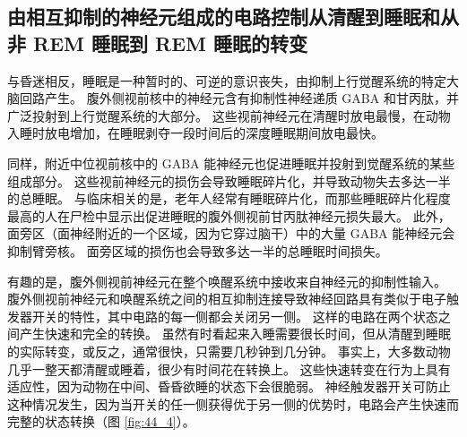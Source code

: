\subsection{由相互抑制的神经元组成的电路控制从清醒到睡眠和从非 REM 睡眠到 REM 睡眠的转变}

与昏迷相反，睡眠是一种暂时的、可逆的意识丧失，由抑制上行觉醒系统的特定大脑回路产生。
腹外侧视前核中的神经元含有抑制性神经递质 GABA 和甘丙肽，并广泛投射到上行觉醒系统的大部分。
这些视前神经元在清醒时放电最慢，在动物入睡时放电增加，在睡眠剥夺一段时间后的深度睡眠期间放电最快。


同样，附近中位视前核中的 GABA 能神经元也促进睡眠并投射到觉醒系统的某些组成部分。
这些视前神经元的损伤会导致睡眠碎片化，并导致动物失去多达一半的总睡眠。
与临床相关的是，老年人经常有睡眠碎片化，而那些睡眠碎片化程度最高的人在尸检中显示出促进睡眠的腹外侧视前甘丙肽神经元损失最大。
此外，面旁区（面神经附近的一个区域，因为它穿过脑干）中的大量 GABA 能神经元会抑制臂旁核。
面旁区域的损伤也会导致多达一半的总睡眠时间损失。


有趣的是，腹外侧视前神经元在整个唤醒系统中接收来自神经元的抑制性输入。
腹外侧视前神经元和唤醒系统之间的相互抑制连接导致神经回路具有类似于电子触发器开关的特性，其中电路的每一侧都会关闭另一侧。
这样的电路在两个状态之间产生快速和完全的转换。
虽然有时看起来入睡需要很长时间，但从清醒到睡眠的实际转变，或反之，通常很快，只需要几秒钟到几分钟。
事实上，大多数动物几乎一整天都清醒或睡着，很少有时间花在转换上。
这些快速转变在行为上具有适应性，因为动物在中间、昏昏欲睡的状态下会很脆弱。
神经触发器开关可防止这种情况发生，因为当开关的任一侧获得优于另一侧的优势时，电路会产生快速而完整的状态转换（图 \ref{fig:44_4}）。


